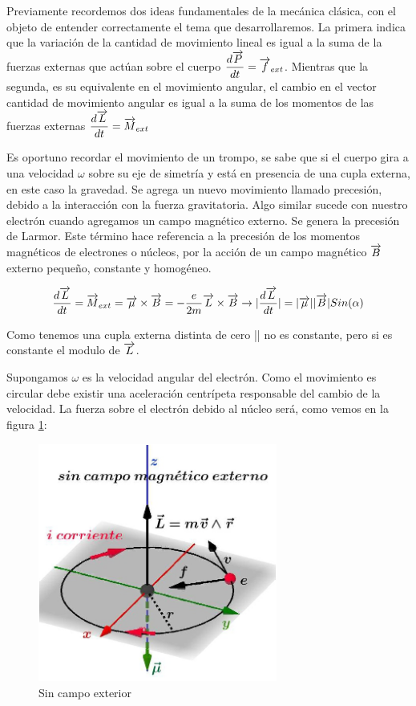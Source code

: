 Previamente recordemos dos ideas fundamentales de la mecánica clásica, con el objeto de entender correctamente el tema que desarrollaremos. La primera indica que la variación de la cantidad de movimiento lineal es igual a la suma de la fuerzas externas que actúan sobre el cuerpo $\dfrac{d\overrightarrow{P}}{dt}=\overrightarrow{f}_{ext}$. Mientras que la segunda, es su equivalente en el movimiento angular, el cambio en el vector cantidad de movimiento angular es igual a la suma de los momentos de las fuerzas externas  $\dfrac{d\overrightarrow{L}}{dt}=\overrightarrow{M}_{ext}$

Es oportuno recordar el movimiento de un trompo, se sabe que si el cuerpo gira a una velocidad $\omega$ sobre su eje de simetría y está en presencia de una cupla externa, en este caso la gravedad. Se agrega un nuevo movimiento llamado precesión, debido a la interacción con la fuerza gravitatoria. Algo similar sucede con nuestro electrón cuando agregamos un campo magnético externo. Se genera la precesión de Larmor. Este término hace referencia a la precesión de los momentos magnéticos de electrones o núcleos, por la acción de un campo magnético $\overrightarrow{B}$ externo pequeño, constante y homogéneo.

\begin{equation*}
	\dfrac{d\overrightarrow{L}}{dt}=\overrightarrow{M}_{ext} = \overrightarrow{\mu} \times \overrightarrow{B} = -\dfrac{e}{2m}\overrightarrow{L}\times\overrightarrow{B}\rightarrow |\dfrac{d\overrightarrow{L}}{dt}|= |\overrightarrow{\mu}||\overrightarrow{B}| Sin(\alpha)
\end{equation*}

Como tenemos una cupla externa distinta de cero || no es constante, pero si es constante el modulo de $\overrightarrow{L}$.

Supongamos $\omega$ es la velocidad angular del electrón. Como el movimiento es circular debe existir una aceleración centrípeta responsable del cambio de la velocidad. La fuerza sobre el electrón debido al núcleo será, como vemos en la figura \ref{fig:s8}:

\begin{figure}[H]
    \centering
    \includegraphics[width=0.7\textwidth]{./Figures/fig_s8}
	\caption{Sin campo exterior}
	\label{fig:s8}
\end{figure}

